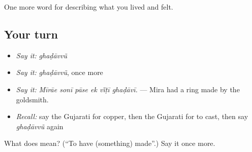 \begin{grammarlens}[title={What you've built}]
One more word for describing what you lived and felt.
\end{grammarlens}

\subsection*{Your turn}
\begin{itemize}
\raggedright
  \item \emph{Say it:} \emph{ghaḍāvvũ}
  \item \emph{Say it:} \emph{ghaḍāvvũ}, once more
  \item \emph{Say it:} \emph{Mīrāe sonī pāse ek vī̃ṭī ghaḍāvī.} — Mira had a ring made by the goldsmith.
  \item \emph{Recall:} say the Gujarati for copper, then the Gujarati for to cast, then say \emph{ghaḍāvvũ} again
\end{itemize}

\begin{tcolorbox}[breakable,colback=teal!4,colframe=teal!35!black,title={Before you move on}]
What does  mean? (\textquotedblleft{}To have (something) made\textquotedblright{}.) Say it once more.
\end{tcolorbox}
